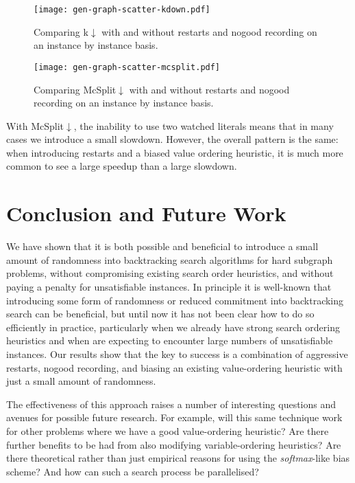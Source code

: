 \documentclass[letterpaper]{article} %
\begin{document}
\begin{figure}[p]
    \centering
    \texttt{[image: gen-graph-scatter-kdown.pdf]}
    \caption{Comparing k${\downarrow}$ with and without restarts and nogood recording on an instance
    by instance basis.}\label{figure:kdown}
\end{figure}

\begin{figure}[p]
    \centering
    \texttt{[image: gen-graph-scatter-mcsplit.pdf]}
    \caption{Comparing McSplit${\downarrow}$ with and without restarts and nogood recording on an instance
    by instance basis.}\label{figure:mcsplit}
\end{figure}


With McSplit${\downarrow}$, the inability to use two watched literals means that in many cases we
introduce a small slowdown. However, the overall pattern is the same: when introducing restarts and
a biased value ordering heuristic, it is much more common to see a large speedup than a large
slowdown.

\section{Conclusion and Future Work}

We have shown that it is both possible and beneficial to introduce a small amount of randomness into
backtracking search algorithms for hard subgraph problems, without compromising existing search
order heuristics, and without paying a penalty for unsatisfiable instances. In principle it is
well-known that introducing some form of randomness \cite{DBLP:conf/aaai/GomesSK98} or reduced
commitment \cite{DBLP:conf/ijcai/HarveyG95} into backtracking search can be beneficial, but until
now it has not been clear how to do so efficiently in practice, particularly when we already have
strong search ordering heuristics and when are expecting to encounter large numbers of unsatisfiable
instances. Our results show that the key to success is a combination of aggressive restarts, nogood
recording, and biasing an existing value-ordering heuristic with just a small amount of randomness.

The effectiveness of this approach raises a number of interesting questions and avenues for possible
future research. For example, will this same technique work for other problems where we have a good
value-ordering heuristic? Are there further benefits to be had from also modifying variable-ordering
heuristics? Are there theoretical rather than just empirical reasons for using the
\emph{softmax}-like bias scheme? And how can such a search process be parallelised?
\end{document}
